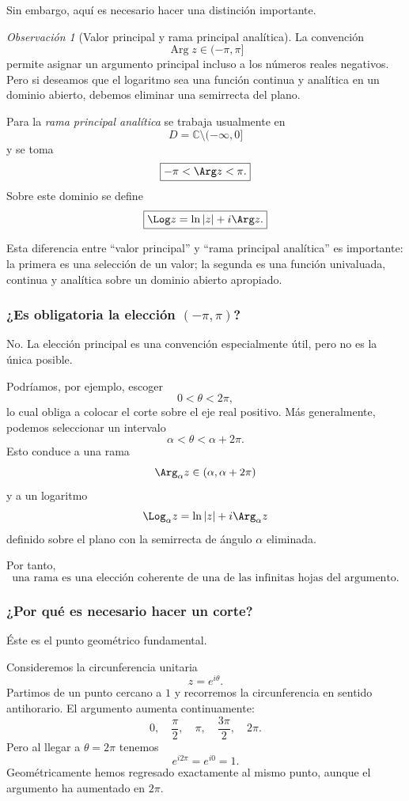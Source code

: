\documentclass[12pt]{article}
\theoremstyle{definition}
\theoremstyle{remark}
\newtheorem{observacion}{Observación}[section]
\begin{document}
Sin embargo, aquí es necesario hacer una distinción importante.

\begin{observacion}[Valor principal y rama principal analítica]
La convención
\[
\operatorname{Arg}z\in(-\pi,\pi]
\]
permite asignar un argumento principal incluso a los números reales negativos.
Pero si deseamos que el logaritmo sea una función continua y analítica en un
dominio abierto, debemos eliminar una semirrecta del plano.

Para la \emph{rama principal analítica} se trabaja usualmente en
\[
\boxed{
D=\mathbb C\setminus(-\infty,0]
}
\]
y se toma
\[
\boxed{
-\pi<\Arg z<\pi.
}
\]
Sobre este dominio se define
\[
\boxed{
\Log z=\ln|z|+i\Arg z.
}
\]
\end{observacion}

Esta diferencia entre ``valor principal'' y ``rama principal analítica'' es
importante: la primera es una selección de un valor; la segunda es una función
univaluada, continua y analítica sobre un dominio abierto apropiado.

\subsubsection{¿Es obligatoria la elección $(-\pi,\pi)$?}

No. La elección principal es una convención especialmente útil, pero no es la
única posible.

Podríamos, por ejemplo, escoger
\[
0<\theta<2\pi,
\]
lo cual obliga a colocar el corte sobre el eje real positivo. Más generalmente,
podemos seleccionar un intervalo
\[
\alpha<\theta<\alpha+2\pi.
\]
Esto conduce a una rama
\[
\Arg_\alpha z\in(\alpha,\alpha+2\pi)
\]
y a un logaritmo
\[
\Log_\alpha z
=
\ln|z|+i\Arg_\alpha z
\]
definido sobre el plano con la semirrecta de ángulo $\alpha$ eliminada.

Por tanto,
\[
\boxed{
\text{una rama es una elección coherente de una de las infinitas hojas
del argumento.}
}
\]

\subsubsection{¿Por qué es necesario hacer un corte?}

Éste es el punto geométrico fundamental.

Consideremos la circunferencia unitaria
\[
z=e^{i\theta}.
\]
Partimos de un punto cercano a $1$ y recorremos la circunferencia en sentido
antihorario. El argumento aumenta continuamente:
\[
0,\quad
\frac{\pi}{2},\quad
\pi,\quad
\frac{3\pi}{2},\quad
2\pi.
\]
Pero al llegar a $\theta=2\pi$ tenemos
\[
e^{i2\pi}=e^{i0}=1.
\]
Geométricamente hemos regresado exactamente al mismo punto, aunque el argumento
ha aumentado en $2\pi$.
\end{document}
